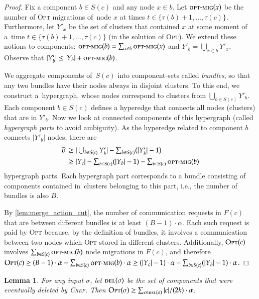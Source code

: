 \documentclass[11pt,a4paper]{scrartcl}
\newtheorem{lemma}[theorem]{Lemma}
\newcommand{\OPT}{\textsc{Opt}\xspace}
\newcommand{\CREP}{\textsc{Crep}\xspace}
\newcommand{\optmig}{\textsc{opt-mig}}
\newcommand{\del}{\textsc{del}}
\begin{document}
\begin{proof}
Fix a component $b \in S(c)$ and any node $x \in b$. Let $\optmig(x)$ be the
number of \OPT migrations of~node $x$ at times $t \in \{ \tau(b)+1, \ldots,
\tau(c) \}$. Furthermore, let $Y'_x$ be the set of clusters that
contained $x$ at some moment of a~time $t \in \{ \tau(b)+1, \ldots, \tau(c)
\}$ (in the solution of \OPT). We extend these notions to components:
$\optmig(b) = \sum_{x \in b} \optmig(x)$ and $Y'_b = \bigcup_{x \in b} Y'_x$.
Observe that $|Y'_b| \leq |Y_b| + \optmig(b)$.

We aggregate components of~$S(c)$ into component-sets called \emph{bundles},
so that any two bundles have their nodes always in disjoint clusters. To this
end, we construct a~hypergraph, whose nodes correspond to clusters from
$\bigcup_{b \in S(c)} Y'_b$. Each component $b \in S(c)$ defines a hyperedge
that connects all nodes (clusters) that are in $Y'_b$. Now we look at
connected components of this hypergraph (called \emph{hypergraph parts} to avoid
ambiguity). As the hyperedge related to component $b$ connects $|Y'_b|$ nodes,
there are
\begin{align*}
	B \,
	\geq &\; \textstyle |\bigcup_{b \in S(c)} Y'_b| - \sum_{b \in S(c)} (|Y'_b|-1) \\
	\geq &\; \textstyle |Y_c| - \sum_{b \in S(c)} (|Y_b|-1) - \sum_{b \in S(c)} \optmig(b)
\end{align*}
hypergraph parts. Each hypergraph part corresponds to a bundle consisting of
components contained in~clusters belonging to this part, i.e., the number of
bundles is also $B$.

By \cref{lem:merge_action_cut}, the number of communication requests in
$F(c)$ that are between different bundles is at least $(B-1) \cdot \alpha$.
Each such request is paid by \OPT because, by the definition of bundles, it involves
a communication between two nodes which \OPT stored in different clusters.
Additionally, $\OPT(c)$ involves $\sum_{b \in S(c)}
\optmig(b)$ node migrations in $F(c)$, and therefore $\OPT(c) \geq (B-1) \cdot
\alpha + \sum_{b \in S(c)} \optmig(b) \cdot \alpha
\geq (|Y_c|-1) \cdot \alpha - \sum_{b \in S(c)} (|Y_b|-1) \cdot \alpha$.
\end{proof}



\begin{lemma}
\label{lem:opt_lower_bound}
For any input $\sigma$, let $\del(\sigma)$ be the set of components that were
eventually deleted by \CREP. Then $\OPT(\sigma) \geq \sum_{c \in \del(\sigma)}
|c| / (2k) \cdot \alpha$.
\end{lemma}
\end{document}
